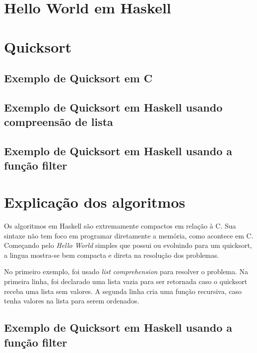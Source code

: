 \documentclass[
  article,			       %
  12pt,				         %
  oneside,			       %
  a4paper,			       %
  english,		       	 %
  brazil,			      	 %
  sumario=tradicional
]{abntex2}
\begin{document}
    \section{Hello World em Haskell}
      

    \section{Quicksort}
      \subsection{Exemplo de Quicksort em C}


      
      \subsection{Exemplo de Quicksort em Haskell usando compreensão de lista} 

            

      \subsection{Exemplo de Quicksort em Haskell usando a função filter}

      

      \section{Explicação dos algoritmos}
      Os algoritmos em Haskell são extremamente compactos em relação à C. Sua sintaxe não tem foco
      em programar diretamente a memória, como acontece em C. Começando pelo \emph{Hello World} simples que possui ou evoluindo
      para um quicksort, a lingua mostra-se bem compacta e direta na resolução dos problemas.

      No primeiro exemplo, foi usado \emph{list comprehension} para resolver o problema. Na primeira linha,
      foi declarado uma lista vazia para ser retornada caso o quicksort receba uma lista sem valores. A segunda linha
      cria uma função recursiva, caso tenha valores na lista para serem ordenados.

      \subsection{Exemplo de Quicksort em Haskell usando a função filter}
\end{document}
